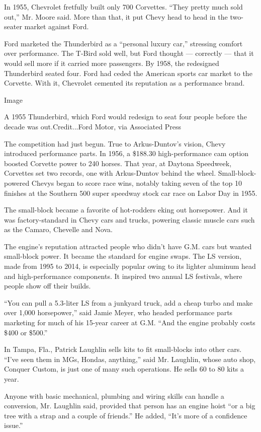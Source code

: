 In 1955, Chevrolet fretfully built only 700 Corvettes. ``They pretty
much sold out,'' Mr. Moore said. More than that, it put Chevy head to
head in the two-seater market against Ford.

Ford marketed the Thunderbird as a ``personal luxury car,'' stressing
comfort over performance. The T-Bird sold well, but Ford thought ---
correctly --- that it would sell more if it carried more passengers. By
1958, the redesigned Thunderbird seated four. Ford had ceded the
American sports car market to the Corvette. With it, Chevrolet cemented
its reputation as a performance brand.

Image

A 1955 Thunderbird, which Ford would redesign to seat four people before
the decade was out.Credit...Ford Motor, via Associated Press

The competition had just begun. True to Arkus-Duntov's vision, Chevy
introduced performance parts. In 1956, a \$188.30 high-performance cam
option boosted Corvette power to 240 horses. That year, at Daytona
Speedweek, Corvettes set two records, one with Arkus-Duntov behind the
wheel. Small-block-powered Chevys began to score race wins, notably
taking seven of the top 10 finishes at the Southern 500 super speedway
stock car race on Labor Day in 1955.

The small-block became a favorite of hot-rodders eking out horsepower.
And it was factory-standard in Chevy cars and trucks, powering classic
muscle cars such as the Camaro, Chevelle and Nova.

The engine's reputation attracted people who didn't have G.M. cars but
wanted small-block power. It became the standard for engine swaps. The
LS version, made from 1995 to 2014, is especially popular owing to its
lighter aluminum head and high-performance components. It inspired two
annual LS festivals, where people show off their builds.

``You can pull a 5.3-liter LS from a junkyard truck, add a cheap turbo
and make over 1,000 horsepower,'' said Jamie Meyer, who headed
performance parts marketing for much of his 15-year career at G.M. ``And
the engine probably costs \$400 or \$500.''

In Tampa, Fla., Patrick Laughlin sells kits to fit small-blocks into
other cars. ``I've seen them in MGs, Hondas, anything,'' said Mr.
Laughlin, whose auto shop, Conquer Custom, is just one of many such
operations. He sells 60 to 80 kits a year.

Anyone with basic mechanical, plumbing and wiring skills can handle a
conversion, Mr. Laughlin said, provided that person has an engine hoist
``or a big tree with a strap and a couple of friends.'' He added, ``It's
more of a confidence issue.''

